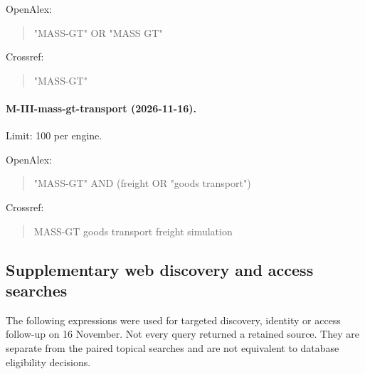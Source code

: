 \noindent OpenAlex:

\begin{quote}\footnotesize\ttfamily\raggedright

"MASS-GT" OR "MASS GT"

\end{quote}

\noindent Crossref:

\begin{quote}\footnotesize\ttfamily\raggedright

"MASS-GT"

\end{quote}

\paragraph{M-III-mass-gt-transport (2026-11-16).} Limit: 100 per engine.

\noindent OpenAlex:

\begin{quote}\footnotesize\ttfamily\raggedright

"MASS-GT" AND (freight OR "goods transport")

\end{quote}

\noindent Crossref:

\begin{quote}\footnotesize\ttfamily\raggedright

MASS-GT goods transport freight simulation

\end{quote}

\subsection{Supplementary web discovery and access searches}

The following expressions were used for targeted discovery, identity or access
follow-up on 16 November. Not every query returned a retained source. They are
separate from the paired topical searches and are not equivalent to database
eligibility decisions.

